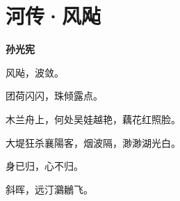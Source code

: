 \documentclass[12pt,a4paper]{ctexbook}
\begin{document}
\section{河传·风飐}
\textbf{孙光宪}\par\vspace{0.5em}
风飐，波敛。\par
团荷闪闪，珠倾露点。\par
木兰舟上，何处吴娃越艳，藕花红照脸。\par
大堤狂杀襄陽客，烟波隔，渺渺湖光白。\par
身已归，心不归。\par
斜晖，远汀鸂鶒飞。\par
\end{document}
